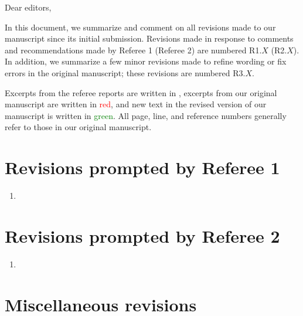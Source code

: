\documentclass[preprint]{revtex4-1}
\newcommand{\1}{\mathds{1}}
\newcommand{\red}[1]{\textcolor{red}{#1}}
\newcommand{\green}[1]{\textcolor{green}{#1}}
\begin{document}
Dear editors,

In this document, we summarize and comment on all revisions made to
our manuscript since its initial submission.  Revisions made in
response to comments and recommendations made by Referee 1 (Referee 2)
are numbered R1.$X$ (R2.$X$).  In addition, we summarize a few minor
revisions made to refine wording or fix errors in the original
manuscript; these revisions are numbered R3.$X$.

Excerpts from the referee reports are written in , excerpts
from our original manuscript are written in \red{red}, and new text in
the revised version of our manuscript is written in \green{green}.
All page, line, and reference numbers generally refer to those in our
original manuscript.


\section*{Revisions prompted by Referee 1}

\begin{enumerate}[label=(R1.\arabic*)]
\item
\end{enumerate}


\section*{Revisions prompted by Referee 2}

\begin{enumerate}[label=(R2.\arabic*)]
\item
\end{enumerate}


\section*{Miscellaneous revisions}
\end{document}
